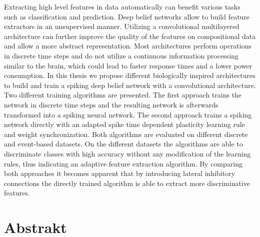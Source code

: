 
\abstract

Extracting high level features in data automatically can benefit various tasks such as classification and prediction. 
Deep belief networks allow to build feature extractors in an unsupervised manner. 
Utilizing a convolutional multilayered architecture can further improve the quality of the features on compositional data and allow a more abstract representation. 
Most architectures perform operations in discrete time steps and do not utilize a continuous information processing similar to the brain, which could lead to faster response times and a lower power consumption. 
In this thesis we propose different biologically inspired architectures to build and train a spiking deep belief network with a convolutional architecture. 
Two different training algorithms are presented.
The first approach trains the network in discrete time steps and the resulting network is afterwards transformed into a spiking neural network.
The second approach trains a spiking network directly with an adapted spike time dependent plasticity learning rule and weight synchronization.
Both algorithms are evaluated on different discrete and event-based datasets.
On the different datasets the algorithms are able to discriminate classes with high accuracy without any modification of the learning rules, thus indicating an adaptive feature extraction algorithm.
By comparing both approaches it becomes apparent that by introducing lateral inhibitory connections the directly trained algorithm is able to extract more discriminative features.
 
\chapter*{Abstrakt}

